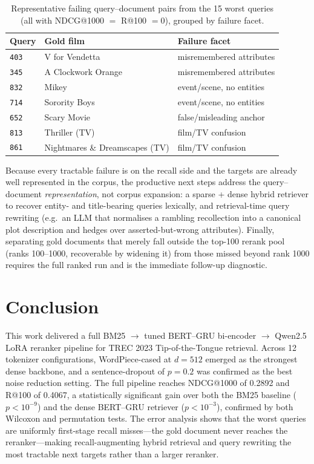 \documentclass[conference]{IEEEtran}
\begin{document}
\begin{table}[t]
\centering
\caption{Representative failing query--document pairs from the 15 worst
queries (all with NDCG@1000 $=$ R@100 $= 0$), grouped by failure facet.}
\label{tab:errors}
\begin{tabular}{llp{3.3cm}}
\toprule
Query & Gold film & Failure facet \\
\midrule
\texttt{403} & V for Vendetta        & misremembered attributes \\
\texttt{345} & A Clockwork Orange    & misremembered attributes \\
\texttt{832} & Mikey                 & event/scene, no entities \\
\texttt{714} & Sorority Boys         & event/scene, no entities \\
\texttt{652} & Scary Movie           & false/misleading anchor \\
\texttt{813} & Thriller (TV)         & film/TV confusion \\
\texttt{861} & Nightmares \& Dreamscapes (TV) & film/TV confusion \\
\bottomrule
\end{tabular}
\end{table}

Because every tractable failure is on the recall side and the targets are
already well represented in the corpus, the productive next steps address the
query--document \emph{representation}, not corpus expansion: a sparse + dense
hybrid retriever to recover entity- and title-bearing queries lexically, and
retrieval-time query rewriting (e.g.\ an LLM that normalises a rambling
recollection into a canonical plot description and hedges over
asserted-but-wrong attributes). Finally, separating gold documents that merely
fall outside the top-100 rerank pool (ranks 100--1000, recoverable by widening
it) from those missed beyond rank 1000 requires the full ranked run and is the
immediate follow-up diagnostic.

\section{Conclusion}
This work delivered a full BM25 $\rightarrow$ tuned BERT--GRU
bi-encoder $\rightarrow$ Qwen2.5 LoRA reranker pipeline for TREC 2023
Tip-of-the-Tongue retrieval. Across 12 tokenizer configurations,
WordPiece-cased at $d{=}512$ emerged as the strongest dense backbone,
and a sentence-dropout of $p{=}0.2$ was confirmed as the best noise
reduction setting. The full pipeline reaches NDCG@1000 of 0.2892
and R@100 of 0.4067, a statistically significant gain over both the
BM25 baseline ($p < 10^{-9}$) and the dense BERT--GRU retriever
($p < 10^{-3}$), confirmed by both Wilcoxon and permutation tests.
The error analysis shows that the worst queries are uniformly first-stage
recall misses---the gold document never reaches the reranker---making
recall-augmenting hybrid retrieval and query rewriting the most tractable
next targets rather than a larger reranker.
\end{document}
